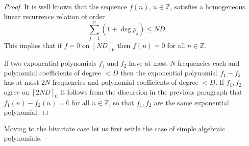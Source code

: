 \documentclass[12pt,a4paper,oneside]{amsart}
\theoremstyle{definition}
\newcommand{\ZZ}{{\mathbb Z}}
\begin{document}
\begin{proof}
It is well known \cite[Ch.\ 1, ``Generalized power sums'']{everest2015recurrence} that the sequence $f(n)$, $n \in \ZZ$, satisfies a homogeneous linear recurrence relation of order
$$
\sum_{j=1}^n (1+\deg p_j) \le N D.
$$
This implies that if $f=0$ on $[ND]_0$ then $f(n) = 0$ for all $n \in \ZZ$.

If two exponential polynomials $f_1$ and $f_2$ have at most $N$ frequencies each and polynomial coefficients of degree $< D$ then the exponential polynomial $f_1-f_2$ has at most $2N$ frequencies and polynomial coefficients of degree $< D$. If $f_1, f_2$ agree on $[2ND]_0$ it follows from the discussion in the previous paragraph that $f_1(n)-f_2(n) = 0$ for all $n \in \ZZ$, so that $f_1, f_2$ are the same exponential polynomial.

\end{proof}

Moving to the bivariate case let us first settle the case of simple algebraic polynomials.
\end{document}
